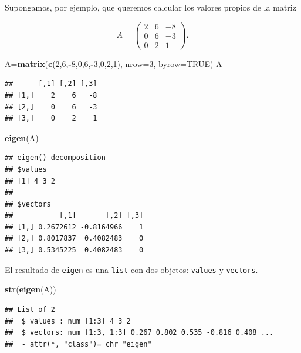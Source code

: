 \documentclass[]{book}
\newenvironment{Shaded}{\begin{snugshade}}{\end{snugshade}}
\newcommand{\DataTypeTok}[1]{\textcolor[rgb]{0.13,0.29,0.53}{#1}}
\newcommand{\DecValTok}[1]{\textcolor[rgb]{0.00,0.00,0.81}{#1}}
\newcommand{\KeywordTok}[1]{\textcolor[rgb]{0.13,0.29,0.53}{\textbf{#1}}}
\newcommand{\NormalTok}[1]{#1}
\newcommand{\OperatorTok}[1]{\textcolor[rgb]{0.81,0.36,0.00}{\textbf{#1}}}
\newcommand{\OtherTok}[1]{\textcolor[rgb]{0.56,0.35,0.01}{#1}}
\theoremstyle{definition}
\theoremstyle{definition}
\theoremstyle{definition}
\theoremstyle{remark}
\begin{document}
Supongamos, por ejemplo, que queremos calcular los valores propios de la matriz

\[
A=\left(\begin{array}{ccc}2 & 6 & -8 \\ 0 & 6 & -3 \\ 0 & 2 & 1\end{array}
\right).
\]

\begin{Shaded}
\begin{Highlighting}[]
\NormalTok{A=}\KeywordTok{matrix}\NormalTok{(}\KeywordTok{c}\NormalTok{(}\DecValTok{2}\NormalTok{,}\DecValTok{6}\NormalTok{,}\OperatorTok{-}\DecValTok{8}\NormalTok{,}\DecValTok{0}\NormalTok{,}\DecValTok{6}\NormalTok{,}\OperatorTok{-}\DecValTok{3}\NormalTok{,}\DecValTok{0}\NormalTok{,}\DecValTok{2}\NormalTok{,}\DecValTok{1}\NormalTok{), }\DataTypeTok{nrow=}\DecValTok{3}\NormalTok{, }\DataTypeTok{byrow=}\OtherTok{TRUE}\NormalTok{)}
\NormalTok{A}
\end{Highlighting}
\end{Shaded}

\begin{verbatim}
##      [,1] [,2] [,3]
## [1,]    2    6   -8
## [2,]    0    6   -3
## [3,]    0    2    1
\end{verbatim}

\begin{Shaded}
\begin{Highlighting}[]
\KeywordTok{eigen}\NormalTok{(A)}
\end{Highlighting}
\end{Shaded}

\begin{verbatim}
## eigen() decomposition
## $values
## [1] 4 3 2
## 
## $vectors
##           [,1]       [,2] [,3]
## [1,] 0.2672612 -0.8164966    1
## [2,] 0.8017837  0.4082483    0
## [3,] 0.5345225  0.4082483    0
\end{verbatim}

El resultado de \texttt{eigen} es una \texttt{list} con dos objetos: \texttt{values} y \texttt{vectors}.

\begin{Shaded}
\begin{Highlighting}[]
\KeywordTok{str}\NormalTok{(}\KeywordTok{eigen}\NormalTok{(A))}
\end{Highlighting}
\end{Shaded}

\begin{verbatim}
## List of 2
##  $ values : num [1:3] 4 3 2
##  $ vectors: num [1:3, 1:3] 0.267 0.802 0.535 -0.816 0.408 ...
##  - attr(*, "class")= chr "eigen"
\end{verbatim}
\end{document}

